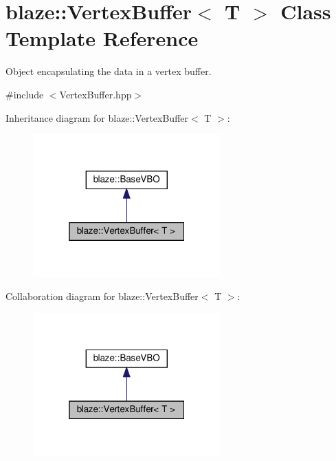 \hypertarget{classblaze_1_1VertexBuffer}{}\section{blaze\+:\+:Vertex\+Buffer$<$ T $>$ Class Template Reference}
\label{classblaze_1_1VertexBuffer}


Object encapsulating the data in a vertex buffer.  




{\ttfamily \#include $<$Vertex\+Buffer.\+hpp$>$}



Inheritance diagram for blaze\+:\+:Vertex\+Buffer$<$ T $>$\+:\nopagebreak
\begin{figure}[H]
\begin{center}
\leavevmode
\includegraphics[width=205pt]{classblaze_1_1VertexBuffer__inherit__graph}
\end{center}
\end{figure}


Collaboration diagram for blaze\+:\+:Vertex\+Buffer$<$ T $>$\+:\nopagebreak
\begin{figure}[H]
\begin{center}
\leavevmode
\includegraphics[width=205pt]{classblaze_1_1VertexBuffer__coll__graph}
\end{center}
\end{figure}

